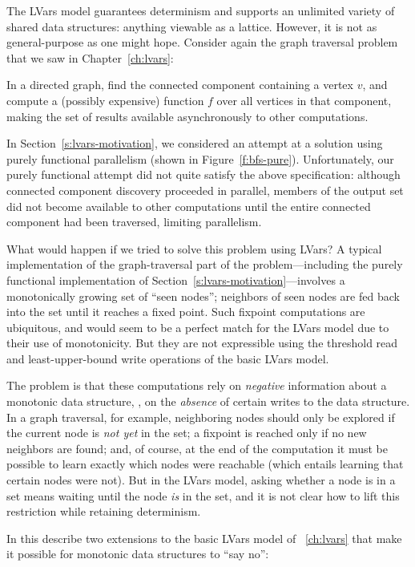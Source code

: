 The LVars model  guarantees determinism and supports an unlimited
variety of shared data structures: anything viewable as a lattice.
However, it is not as general-purpose as one might hope.  Consider
again the graph traversal problem that we saw in 
Chapter~\ref{ch:lvars}:
\begin{blockquote}
  In a directed graph, find the connected component containing a
  vertex $v$, and compute a (possibly expensive) function $f$ over all
  vertices in that component, making the set of results available
  asynchronously to other computations.
\end{blockquote}
In Section~\ref{s:lvars-motivation}, we considered an attempt at a
solution using purely functional parallelism (shown
in Figure~\ref{f:bfs-pure}).  Unfortunately, our purely functional
attempt did not quite satisfy the above specification: although
connected component discovery proceeded in parallel, members of the
output set did not become available to other computations until the
entire connected component had been traversed, limiting parallelism.

What would happen if we tried to solve this problem using LVars?  A
typical implementation of the graph-traversal part of the
problem---including the purely functional implementation of
Section~\ref{s:lvars-motivation}---involves a monotonically growing
set of ``seen nodes''; neighbors of seen nodes are fed back into the
set until it reaches a fixed point.  Such fixpoint computations are
ubiquitous, and would seem to be a perfect match for the LVars model
due to their use of monotonicity.  But they are not expressible using
the threshold read and least-upper-bound write operations of the basic
LVars model.

The problem is that these computations rely on \emph{negative}
information about a monotonic data structure, \ie, on the
\emph{absence} of certain writes to the data structure.  In a graph
traversal, for example, neighboring nodes should only be explored if
the current node is \emph{not yet} in the set; a fixpoint is reached
only if no new neighbors are found; and, of course, at the end of the
computation it must be possible to learn exactly which nodes were
reachable (which entails learning that certain nodes were not).  But
in the LVars model, asking whether a node is in a set means waiting
until the node \emph{is} in the set, and it is not clear how to lift
this restriction while retaining determinism.

In this  describe two extensions to the basic LVars model of
~\ref{ch:lvars} that make it possible for monotonic data
structures to ``say no'':

